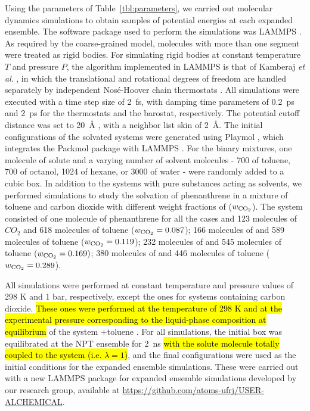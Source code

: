 \documentclass[final,12p,times,twocolumn]{elsarticle}
\begin{document}
	Using the parameters of Table~\ref{tbl:parameters}, we carried out molecular dynamics simulations to obtain samples of potential energies at each expanded ensemble. The software package used to perform the simulations was LAMMPS \cite{lammps}. As required by the coarse-grained model, molecules with more than one segment were treated as rigid bodies. For simulating rigid bodies at constant temperature $T$ and pressure $P$, the algorithm implemented in LAMMPS is that of Kamberaj \textit{et al}. \cite{kamberaj}, in which the translational and rotational degrees of freedom are handled separately by independent Nos\'{e}-Hoover chain thermostats \cite{PhysRevA.31.1695}. All simulations were executed with a time step size of 2~fs, with damping time parameters of 0.2~ps and 2~ps for the thermostats and the barostat, respectively. The potential cutoff distance was set to 20~$\text{\AA}$ \cite{muller2017}, with a neighbor list skin of 2~$\text{\AA}$. The initial configurations of the solvated systems were generated using Playmol \cite{playmol}, which integrates the Packmol package \cite{packmol} with LAMMPS \cite{lammps}. For the binary mixtures, one molecule of solute and a varying number of solvent molecules - 700 of toluene, 700 of octanol, 1024 of hexane, or 3000 of water - were randomly added to a cubic box. In addition to the systems with pure substances acting as solvents, we performed simulations to study the solvation of phenanthrene in a mixture of toluene and carbon dioxide with different weight fractions of  ($w_\text{\ce{CO_2}}$). The system consisted of one molecule of phenanthrene for all the cases and 123 molecules of $CO_{2}$ and 618 molecules of toluene ($w_\text{\ce{CO_2}} = 0.087$); 166 molecules of  and 589 molecules of toluene ($w_\text{\ce{CO_2}} = 0.119$); 232 molecules of  and 545 molecules of toluene ($w_\text{\ce{CO_2}} = 0.169)$; 380 molecules of  and 446 molecules of toluene ($w_\text{\ce{CO_2}} = 0.289$).

	All simulations were performed at constant temperature and pressure values of 298 K and 1 bar, respectively, except the ones for systems containing carbon dioxide. \hl{These ones were performed at the temperature of 298 K and at the experimental pressure corresponding to the liquid-phase composition at equilibrium} of the system +toluene \cite{co2toliq}. For all simulations, the initial box was equilibrated at the NPT ensemble for 2~ns \hl{with the solute molecule totally coupled to the system (i.e. $\lambda = 1$)}, and the final configurations were used as the initial conditions for the expanded ensemble simulations. These were carried out with a new LAMMPS package for expanded ensemble simulations developed by our research group, available at \url{https://github.com/atoms-ufrj/USER-ALCHEMICAL}.
\end{document}
